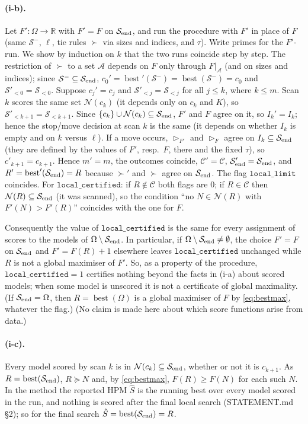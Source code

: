 \documentclass[11pt]{article}
\theoremstyle{remark}
\newcommand{\cS}{\mathcal{S}}
\newcommand{\cN}{\mathcal{N}}
\newcommand{\cC}{\mathcal{C}}
\newcommand{\best}{\operatorname{best}}
\newcommand{\cert}{\texttt{local\_certified}}
\newcommand{\llim}{\texttt{local\_limit}}
\begin{document}
\paragraph{(i-b).}
Let $F':\Omega\to\mathbb{R}$ with $F'=F$ on $\cS_{\rm end}$, and run the procedure with $F'$ in place of $F$ (same $\cS^-$, $\ell$, tie rules $\succ$ via sizes and indices, and $\tau$). Write primes for the $F'$-run. We show by induction on $k$ that the two runs coincide step by step. The restriction of $\succ$ to a set $\mathcal A$ depends on $F$ only through $F|_{\mathcal A}$ (and on sizes and indices); since $\cS^-\subseteq\cS_{\rm end}$, $c_0'=\best'(\cS^-)=\best(\cS^-)=c_0$ and $\cS'_{<0}=\cS_{<0}$. Suppose $c_j'=c_j$ and $\cS'_{<j}=\cS_{<j}$ for all $j\le k$, where $k\le m$. Scan $k$ scores the same set $\cN(c_k)$ (it depends only on $c_k$ and $K$), so $\cS'_{<k+1}=\cS_{<k+1}$. Since $\{c_k\}\cup\cN(c_k)\subseteq\cS_{\rm end}$, $F'$ and $F$ agree on it, so $I_k'=I_k$; hence the stop/move decision at scan $k$ is the same (it depends on whether $I_k$ is empty and on $k$ versus $\ell$). If a move occurs, $\rhd_{F'}$ and $\rhd_F$ agree on $I_k\subseteq\cS_{\rm end}$ (they are defined by the values of $F'$, resp.\ $F$, there and the fixed $\tau$), so $c'_{k+1}=c_{k+1}$. Hence $m'=m$, the outcomes coincide, $\cC'=\cC$, $\cS'_{\rm end}=\cS_{\rm end}$, and $R'=\best'(\cS_{\rm end})=R$ because $\succ'$ and $\succ$ agree on $\cS_{\rm end}$. The flag $\llim$ coincides. For $\cert$: if $R\notin\cC$ both flags are $0$; if $R\in\cC$ then $\cN(R)\subseteq\cS_{\rm end}$ (it was scanned), so the condition ``no $N\in\cN(R)$ with $F'(N)>F'(R)$'' coincides with the one for $F$.

Consequently the value of $\cert$ is the same for every assignment of scores to the models of $\Omega\setminus\cS_{\rm end}$. In particular, if $\Omega\setminus\cS_{\rm end}\ne\emptyset$, the choice $F'=F$ on $\cS_{\rm end}$ and $F'=F(R)+1$ elsewhere leaves $\cert$ unchanged while $R$ is not a global maximiser of $F'$. So, as a property of the procedure, $\cert=1$ certifies nothing beyond the facts in (i-a) about scored models; when some model is unscored it is not a certificate of global maximality. (If $\cS_{\rm end}=\Omega$, then $R=\best(\Omega)$ is a global maximiser of $F$ by \eqref{eq:bestmax}, whatever the flag.) (No claim is made here about which score functions arise from data.)

\paragraph{(i-c).}
Every model scored by scan $k$ is in $\cN(c_k)\subseteq\cS_{\rm end}$, whether or not it is $c_{k+1}$. As $R=\best(\cS_{\rm end})$, $R\succeq N$ and, by \eqref{eq:bestmax}, $F(R)\ge F(N)$ for each such $N$. In the method the reported HPM $\hat S$ is the running best over every model scored in the run, and nothing is scored after the final local search (STATEMENT.md \S2); so for the final search $\hat S=\best(\cS_{\rm end})=R$.
\end{document}
